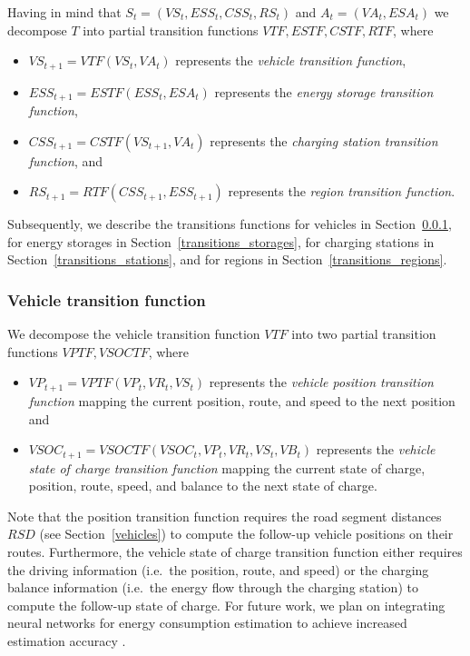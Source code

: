 Having in mind that $S_t = (VS_t, ESS_t, CSS_t, RS_t)$ and $A_t = (VA_t, ESA_t)$ we decompose $T$ into partial transition functions $VTF,ESTF,CSTF,RTF$, where
\begin{itemize}
	\item $VS_{t+1} = VTF(VS_t, VA_t)$ represents the \textit{vehicle transition function},
	\item $ESS_{t+1} = ESTF(ESS_t, ESA_t)$ represents the \textit{energy storage transition function},
	\item $CSS_{t+1} = CSTF(VS_{t+1}, VA_t)$ represents the \textit{charging station transition function}, and
	\item $RS_{t+1} = RTF(CSS_{t+1}, ESS_{t+1})$ represents the \textit{region transition function}.
\end{itemize}
Subsequently, we describe the transitions functions for vehicles in Section~\ref{transitions_vehicles}, for energy storages in Section~\ref{transitions_storages}, for charging stations in Section~\ref{transitions_stations}, and for regions in Section~\ref{transitions_regions}.  

\subsubsection{Vehicle transition function}
\label{transitions_vehicles}

We decompose the vehicle transition function $VTF$ into two partial transition functions $VPTF,VSOCTF$, where
\begin{itemize}
	\item $VP_{t+1} = VPTF(VP_t, VR_t, VS_t)$ represents the \textit{vehicle position transition function} mapping the current position, route, and speed to the next position and
	\item $VSOC_{t+1} = VSOCTF(VSOC_t, VP_t, VR_t, VS_t, VB_t)$ represents the \textit{vehicle state of charge transition function} mapping the current state of charge, position, route, speed, and balance to the next state of charge.
\end{itemize}
Note that the position transition function requires the road segment distances $RSD$ (see Section~\ref{vehicles}) to compute the follow-up vehicle positions on their routes. Furthermore, the vehicle state of charge transition function either requires the driving information (i.e.\ the position, route, and speed) or the charging balance information (i.e.\ the energy flow through the charging station) to compute the follow-up state of charge. For future work, we plan on integrating neural networks for energy consumption estimation to achieve increased estimation accuracy \cite{felipe2015energy}.

